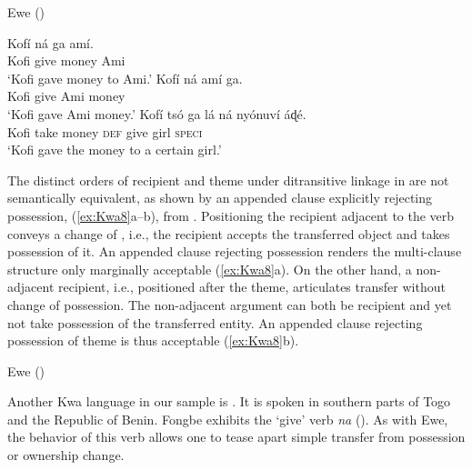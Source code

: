 \documentclass[output=paper,colorlinks,citecolor=brown]{langscibook}
\begin{document}
\ea \label{ex:Kwa7} Ewe (\citealt[143, 145, 156]{Essegbey1999})
\begin{xlist}
\ex
\gll Kofí		ná			ga				amí.\\
					Kofi	give		money	Ami\\
\glt		‘Kofi gave money to Ami.’
\ex
\gll 	Kofí		ná			amí		ga.\\
					Kofi	give		Ami		money	\\
\glt					‘Kofi gave Ami money.’
\ex 
\gll 	Kofí		tsó			ga				lá		ná			nyónuví	áɖé.\\
					Kofi	take		money	\textsc{def}	give		girl				\textsc{speci}\\
\glt					‘Kofi gave the money to a certain girl.’
\end{xlist}
\z

The distinct orders of recipient and theme under ditransitive linkage in  are not semantically equivalent, as shown by an appended clause explicitly rejecting possession, (\ref{ex:Kwa8}a--b), from \citet{Essegbey1999}. Positioning the recipient adjacent to the verb conveys a change of , i.e., the recipient accepts the transferred object and takes possession of it. An appended clause rejecting possession renders the multi-clause structure only marginally acceptable (\ref{ex:Kwa8}a). On the other hand, a non-adjacent recipient, i.e., positioned after the theme, articulates transfer without change of possession. The non-adjacent argument can both be recipient and yet not take possession of the transferred entity. An appended clause rejecting possession of theme is thus acceptable (\ref{ex:Kwa8}b).

\ea \label{ex:Kwa8} Ewe (\citealt[164]{Essegbey1999})
\begin{xlist}
\end{xlist}
\z

Another Kwa language in our sample is . It is spoken in southern parts of Togo and the Republic of Benin. Fongbe exhibits the ‘give’ verb \textit{na} (\citealt{Lefebvre_Brousseau2002}). As with Ewe, the behavior of this verb allows one to tease apart simple transfer from possession or ownership change.\largerpage[-2]
\end{document}

